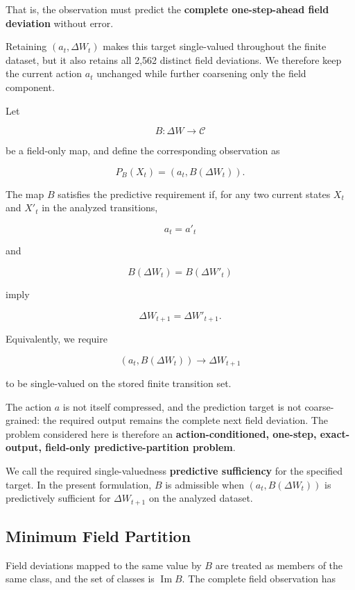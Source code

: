 \documentclass[
  11pt,
]{article}
\begin{document}
That is, the observation must predict the \textbf{complete
one-step-ahead field deviation} without error.

Retaining \({(a_t,\Delta W_t)}\) makes this target single-valued
throughout the finite dataset, but it also retains all 2,562 distinct
field deviations. We therefore keep the current action \({a_t}\)
unchanged while further coarsening only the field component.

Let

\[{B:\Delta W\longrightarrow\mathcal C}\]

be a field-only map, and define the corresponding observation as

\[{P_B(X_t)=\left(a_t,B(\Delta W_t)\right).}\]

The map \({B}\) satisfies the predictive requirement if, for any two
current states \({X_t}\) and \({X'_t}\) in the analyzed transitions,

\[{a_t=a'_t}\]

and

\[{B(\Delta W_t)=B(\Delta W'_t)}\]

imply

\[{\Delta W_{t+1}=\Delta W'_{t+1}.}\]

Equivalently, we require

\[{\left(a_t,B(\Delta W_t)\right)\longrightarrow\Delta W_{t+1}}\]

to be single-valued on the stored finite transition set.

The action \({a}\) is not itself compressed, and the prediction target
is not coarse-grained: the required output remains the complete next
field deviation. The problem considered here is therefore an
\textbf{action-conditioned, one-step, exact-output, field-only
predictive-partition problem}.

We call the required single-valuedness \textbf{predictive sufficiency}
for the specified target. In the present formulation, \({B}\) is
admissible when \({(a_t,B(\Delta W_t))}\) is predictively sufficient for
\({\Delta W_{t+1}}\) on the analyzed dataset.

\subsection{Minimum Field Partition}\label{minimum-field-partition}

Field deviations mapped to the same value by \({B}\) are treated as
members of the same class, and the set of classes is
\({\operatorname{Im}B}\). The complete field observation has
\end{document}
